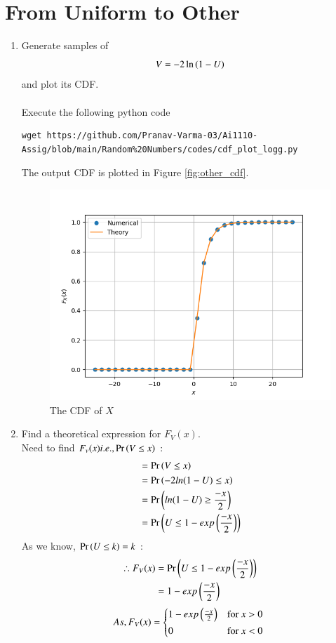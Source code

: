 \documentclass[journal,12pt,twocolumn]{IEEEtran}
\renewcommand\thesection{\arabic{section}}
\begin{document}
\section{From Uniform to Other}
\begin{enumerate}[label=\textbf{\thesection.\arabic*},ref=\thesection.\theenumi]
%
\item
Generate samples of 
%
\begin{equation}
V = -2\ln\left(1-U\right)
\end{equation}
%
and plot its CDF. 
\\
\\
\solution
Execute the following python code
\begin{lstlisting}
wget https://github.com/Pranav-Varma-03/Ai1110-Assig/blob/main/Random%20Numbers/codes/cdf_plot_logg.py
\end{lstlisting}
%
The output CDF is plotted in Figure \eqref{fig:other_cdf}.
\begin{figure}[!ht]
\centering
\includegraphics[width=\columnwidth]{figs/cdf_plot_other.png}
\caption{The CDF of $X$}
\label{fig:other_cdf}
\end{figure}
%
%
\item Find a theoretical expression for $F_V(x)$.
\solution\\
Need to find $F_v(x) i.e., \Pr\left(V \le x\right)$ :
	\begin{align*}
  	   &= \Pr\left(V \le x\right)\\
  	   &= \Pr\left(-2ln(1-U) \le x\right)\\
  	   &= \Pr\left(ln(1-U) \ge \frac{-x}{2}\right) \\
 	   &= \Pr\left(U \le 1 - exp\left(\frac{-x}{2}\right)\right)
	\end{align*}
As we know, $\Pr\left(U \le k\right) = k$ :
	\begin{align*}
  		\therefore F_V(x) &=  \Pr\left(U \le 1 - exp\left(\frac{-x}{2}\right)\right)\\
  		&= 1 - exp\left(\frac{-x}{2}\right)
	\end{align*}
%	
	\begin{equation}
    		As,F_V(x) = 
    		\begin{cases*}
        1 - exp\brak{\frac{-x}{2}} & for $x > 0$ \\
        0 & for $x < 0$
    		\end{cases*}
	\end{equation}
\end{enumerate}
%
\end{document}
